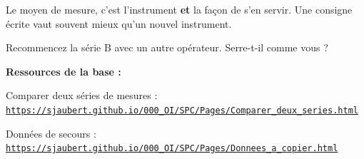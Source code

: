 \documentclass[10pt,a4paper]{article}
\begin{document}
\begin{tcolorbox}[retenir]Le moyen de mesure, c'est l'instrument \textbf{et} la façon de s'en servir. Une consigne écrite vaut souvent mieux qu'un nouvel instrument.\end{tcolorbox}
\begin{tcolorbox}[plus]Recommencez la série B avec un autre opérateur. Serre-t-il comme vous ?\end{tcolorbox}
\vfill{\footnotesize\color{uimm}\textbf{Ressources de la base :}\par Comparer deux séries de mesures : \href{https://sjaubert.github.io/000_OI/SPC/Pages/Comparer_deux_series.html}{\nolinkurl{https://sjaubert.github.io/000_OI/SPC/Pages/Comparer_deux_series.html}}\par Données de secours : \href{https://sjaubert.github.io/000_OI/SPC/Pages/Donnees_a_copier.html\#cliquet}{\nolinkurl{https://sjaubert.github.io/000_OI/SPC/Pages/Donnees_a_copier.html}}}
\end{document}
